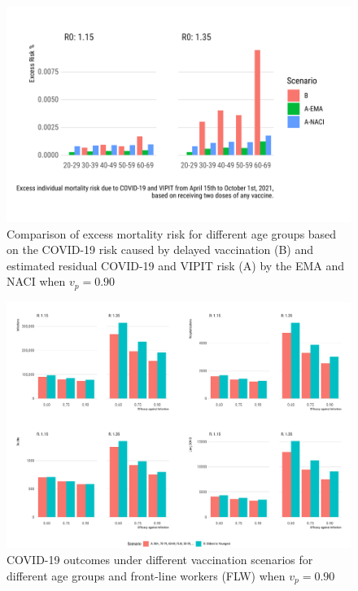 \begin{figure}[htb]
\begin{center}
\includegraphics[width=6in]{"../figures/vp0.90/fig3.pdf"}
\caption{Comparison of excess mortality risk for different age groups based on the COVID-19 risk caused by delayed vaccination (B) and estimated residual COVID-19 and VIPIT risk (A) by the EMA and NACI when $v_p=0.90$}
\end{center}
\end{figure}


\begin{figure}[htb]
\begin{center}
\includegraphics[width=6in]{"../figures/vp0.90/fig-barplots.pdf"}
\caption{COVID-19 outcomes under different vaccination scenarios for different age groups and front-line workers (FLW) when $v_p=0.90$}
\end{center}
\end{figure}

